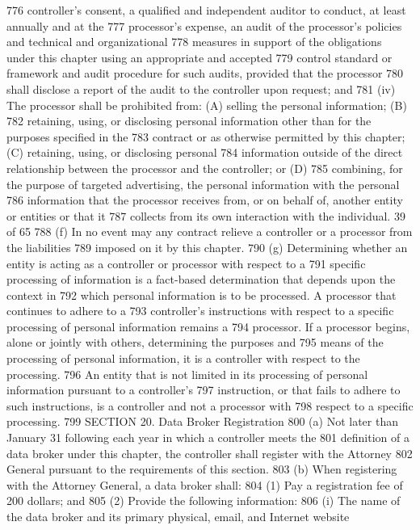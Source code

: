 776 controller’s consent, a qualified and independent auditor to conduct, at least annually and at the
777 processor’s expense, an audit of the processor’s policies and technical and organizational
778 measures in support of the obligations under this chapter using an appropriate and accepted
779 control standard or framework and audit procedure for such audits, provided that the processor
780 shall disclose a report of the audit to the controller upon request; and
781 (iv) The processor shall be prohibited from: (A) selling the personal information; (B)
782 retaining, using, or disclosing personal information other than for the purposes specified in the
783 contract or as otherwise permitted by this chapter; (C) retaining, using, or disclosing personal
784 information outside of the direct relationship between the processor and the controller; or (D)
785 combining, for the purpose of targeted advertising, the personal information with the personal
786 information that the processor receives from, or on behalf of, another entity or entities or that it
787 collects from its own interaction with the individual.
39 of 65
788 (f) In no event may any contract relieve a controller or a processor from the liabilities
789 imposed on it by this chapter.
790 (g) Determining whether an entity is acting as a controller or processor with respect to a
791 specific processing of information is a fact-based determination that depends upon the context in
792 which personal information is to be processed. A processor that continues to adhere to a
793 controller’s instructions with respect to a specific processing of personal information remains a
794 processor. If a processor begins, alone or jointly with others, determining the purposes and
795 means of the processing of personal information, it is a controller with respect to the processing.
796 An entity that is not limited in its processing of personal information pursuant to a controller’s
797 instruction, or that fails to adhere to such instructions, is a controller and not a processor with
798 respect to a specific processing.
799 SECTION 20. Data Broker Registration
800 (a) Not later than January 31 following each year in which a controller meets the
801 definition of a data broker under this chapter, the controller shall register with the Attorney
802 General pursuant to the requirements of this section.
803 (b) When registering with the Attorney General, a data broker shall:
804 (1) Pay a registration fee of 200 dollars; and
805 (2) Provide the following information:
806 (i) The name of the data broker and its primary physical, email, and Internet website
